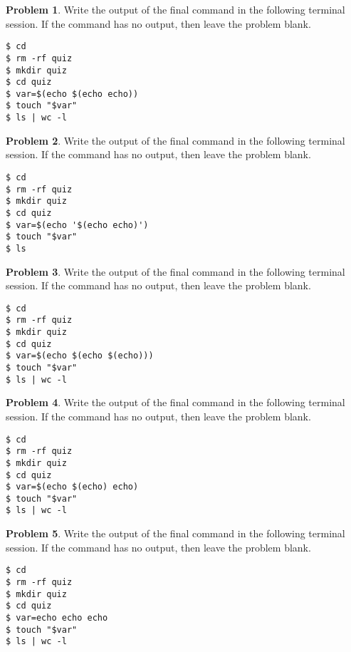 \documentclass[10pt]{article}
\theoremstyle{definition}
\newtheorem{problem}{Problem}
\begin{document}
\begin{problem}
    Write the output of the final command in the following terminal session.
    If the command has no output, then leave the problem blank.
\end{problem}
\begin{lstlisting}
$ cd
$ rm -rf quiz
$ mkdir quiz
$ cd quiz
$ var=$(echo $(echo echo))
$ touch "$var"
$ ls | wc -l
\end{lstlisting}
\vspace{0.4in}


\begin{problem}
    Write the output of the final command in the following terminal session.
    If the command has no output, then leave the problem blank.
\end{problem}
\begin{lstlisting}
$ cd
$ rm -rf quiz
$ mkdir quiz
$ cd quiz
$ var=$(echo '$(echo echo)')
$ touch "$var"
$ ls
\end{lstlisting}
\vspace{0.4in}

\begin{problem}
    Write the output of the final command in the following terminal session.
    If the command has no output, then leave the problem blank.
\end{problem}
\begin{lstlisting}
$ cd
$ rm -rf quiz
$ mkdir quiz
$ cd quiz
$ var=$(echo $(echo $(echo)))
$ touch "$var"
$ ls | wc -l
\end{lstlisting}
\vspace{0.4in}


\begin{problem}
    Write the output of the final command in the following terminal session.
    If the command has no output, then leave the problem blank.
\end{problem}
\begin{lstlisting}
$ cd
$ rm -rf quiz
$ mkdir quiz
$ cd quiz
$ var=$(echo $(echo) echo)
$ touch "$var"
$ ls | wc -l
\end{lstlisting}
\vspace{0.4in}
\begin{problem}
    Write the output of the final command in the following terminal session.
    If the command has no output, then leave the problem blank.
\end{problem}
\begin{lstlisting}
$ cd
$ rm -rf quiz
$ mkdir quiz
$ cd quiz
$ var=echo echo echo
$ touch "$var"
$ ls | wc -l
\end{lstlisting}
\vspace{0.4in}
\end{document}
